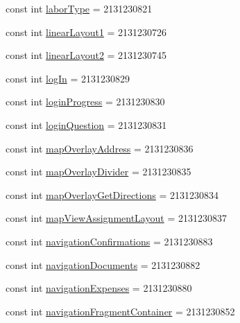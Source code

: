 \begin{DoxyCompactItemize}
\item 
const int \hyperlink{class_field_service_1_1_android_1_1_resource_1_1_id_a9b0cc5cf49e55271b9c70b3fca453fea}{labor\+Type} = 2131230821
\item 
const int \hyperlink{class_field_service_1_1_android_1_1_resource_1_1_id_a823831a7d383681f15ad229abed352d9}{linear\+Layout1} = 2131230726
\item 
const int \hyperlink{class_field_service_1_1_android_1_1_resource_1_1_id_a9868a69ef7cf17d1b7bc328a1860fe0c}{linear\+Layout2} = 2131230745
\item 
const int \hyperlink{class_field_service_1_1_android_1_1_resource_1_1_id_ae6ec7a30cc36823fbfc9289ddd59ffa3}{log\+In} = 2131230829
\item 
const int \hyperlink{class_field_service_1_1_android_1_1_resource_1_1_id_a18c1dcafb51105c04d1f36e4471182e8}{login\+Progress} = 2131230830
\item 
const int \hyperlink{class_field_service_1_1_android_1_1_resource_1_1_id_a40a61926ea628e70613be67d036c4d3c}{login\+Question} = 2131230831
\item 
const int \hyperlink{class_field_service_1_1_android_1_1_resource_1_1_id_aeb46af6e707fa768d42bc68bc32cf897}{map\+Overlay\+Address} = 2131230836
\item 
const int \hyperlink{class_field_service_1_1_android_1_1_resource_1_1_id_a233087953b11f3e8a676122da3b58944}{map\+Overlay\+Divider} = 2131230835
\item 
const int \hyperlink{class_field_service_1_1_android_1_1_resource_1_1_id_ad9493e69f10c4e4b8ca8d580b2bbc9db}{map\+Overlay\+Get\+Directions} = 2131230834
\item 
const int \hyperlink{class_field_service_1_1_android_1_1_resource_1_1_id_a2a4d6de2e815f46b6d22961c916dc8d3}{map\+View\+Assignment\+Layout} = 2131230837
\item 
const int \hyperlink{class_field_service_1_1_android_1_1_resource_1_1_id_adb2dd3e97b577f855b57942de173e7dd}{navigation\+Confirmations} = 2131230883
\item 
const int \hyperlink{class_field_service_1_1_android_1_1_resource_1_1_id_ab0ca5e06725dd2bd39709fb38d51742e}{navigation\+Documents} = 2131230882
\item 
const int \hyperlink{class_field_service_1_1_android_1_1_resource_1_1_id_a11d1ef75513acb235d51f5c62ea790f7}{navigation\+Expenses} = 2131230880
\item 
const int \hyperlink{class_field_service_1_1_android_1_1_resource_1_1_id_a6f947e9afdac54bcd00e93be8430106e}{navigation\+Fragment\+Container} = 2131230852

\end{DoxyCompactItemize}
